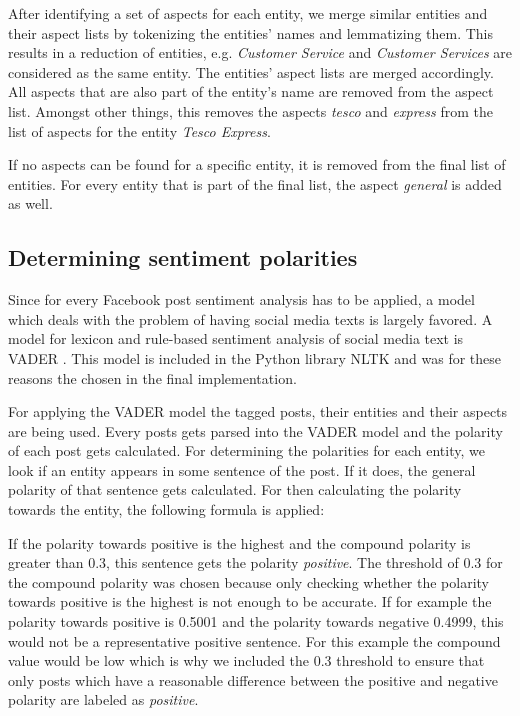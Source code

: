 \documentclass[10pt,a4paper]{article}
\begin{document}
		After identifying a set of aspects for each entity, we merge similar entities and their aspect lists by tokenizing the entities' names and lemmatizing them. This results in a reduction of entities, e.g. \textit{Customer Service} and \textit{Customer Services} are considered as the same entity. The entities' aspect lists are merged accordingly. All aspects that are also part of the entity's name are removed from the aspect list. Amongst other things, this removes the aspects \textit{tesco} and \textit{express} from the list of aspects for the entity \textit{Tesco Express}.

		If no aspects can be found for a specific entity, it is removed from the final list of entities.
		For every entity that is part of the final list, the aspect \textit{general} is added as well.

		\subsection{Determining sentiment polarities}
		\label{sec:sentimentpolarities}
		
		Since for every Facebook post sentiment analysis has to be applied, a model which deals with the problem of having social media texts is largely favored. A model for lexicon and rule-based sentiment analysis of social media text is VADER \cite{vader}. This model is included in the Python library NLTK and was for these reasons the chosen in the final implementation. 
		
		For applying the VADER model the tagged posts, their entities and their aspects are being used. Every posts gets parsed into the VADER model and the polarity of each post gets calculated. For determining the polarities for each entity, we look if an entity appears in some sentence of the post. If it does, the general polarity of that sentence gets calculated. For then calculating the polarity towards the entity, the following formula is applied:
		
		If the polarity towards positive is the highest and the compound polarity is greater than 0.3, this sentence gets the polarity \textit{positive}. The threshold of 0.3 for the compound polarity was chosen because only checking whether the polarity towards positive is the highest is not enough to be accurate. If for example the polarity towards positive is 0.5001 and the polarity towards negative 0.4999, this would not be a representative positive sentence. For this example the compound value would be low which is why we included the 0.3 threshold to ensure that only posts which have a reasonable difference between the positive and negative polarity are labeled as \textit{positive}. 
		
\end{document}
